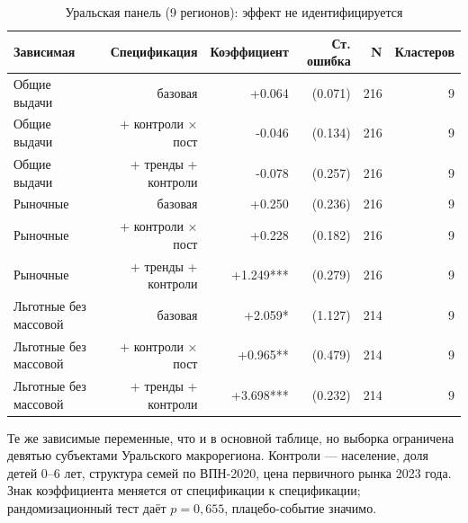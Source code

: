 \begin{table}[htbp]
\centering
\small
\caption{Уральская панель (9 регионов): эффект не идентифицируется}
\label{tab:ural}
\begin{tabular}{lrrrrr}
\toprule
Зависимая & Спецификация & Коэффициент & Ст. ошибка & N & Кластеров \\
\midrule
Общие выдачи & базовая & +0.064 & (0.071) & 216 & 9 \\
Общие выдачи & + контроли × пост & -0.046 & (0.134) & 216 & 9 \\
Общие выдачи & + тренды + контроли & -0.078 & (0.257) & 216 & 9 \\
Рыночные & базовая & +0.250 & (0.236) & 216 & 9 \\
Рыночные & + контроли × пост & +0.228 & (0.182) & 216 & 9 \\
Рыночные & + тренды + контроли & +1.249*** & (0.279) & 216 & 9 \\
Льготные без массовой & базовая & +2.059* & (1.127) & 214 & 9 \\
Льготные без массовой & + контроли × пост & +0.965** & (0.479) & 214 & 9 \\
Льготные без массовой & + тренды + контроли & +3.698*** & (0.232) & 214 & 9 \\
\bottomrule
\end{tabular}
\par\smallskip\begin{minipage}{0.92\textwidth}\footnotesize
Те же зависимые переменные, что и в основной таблице, но выборка ограничена девятью субъектами Уральского макрорегиона. Контроли — население, доля детей 0--6 лет, структура семей по ВПН-2020, цена первичного рынка 2023 года. Знак коэффициента меняется от спецификации к спецификации; рандомизационный тест даёт $p=0{,}655$, плацебо-событие значимо.
\end{minipage}
\end{table}
